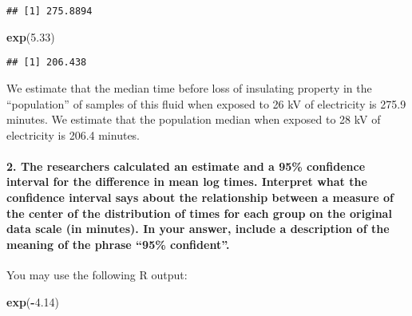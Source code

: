 \documentclass[]{article}
\newenvironment{Shaded}{\begin{snugshade}}{\end{snugshade}}
\newcommand{\FloatTok}[1]{\textcolor[rgb]{0.00,0.00,0.81}{#1}}
\newcommand{\KeywordTok}[1]{\textcolor[rgb]{0.13,0.29,0.53}{\textbf{#1}}}
\newcommand{\NormalTok}[1]{#1}
\newcommand{\OperatorTok}[1]{\textcolor[rgb]{0.81,0.36,0.00}{\textbf{#1}}}
\let\oldparagraph\paragraph
\renewcommand{\paragraph}[1]{\oldparagraph{#1}\mbox{}}
\begin{document}
\begin{verbatim}
## [1] 275.8894
\end{verbatim}

\begin{Shaded}
\begin{Highlighting}[]
\KeywordTok{exp}\NormalTok{(}\FloatTok{5.33}\NormalTok{)}
\end{Highlighting}
\end{Shaded}

\begin{verbatim}
## [1] 206.438
\end{verbatim}

We estimate that the median time before loss of insulating property in
the ``population'' of samples of this fluid when exposed to 26 kV of
electricity is 275.9 minutes. We estimate that the population median
when exposed to 28 kV of electricity is 206.4 minutes.

\vspace{6cm}

\hypertarget{the-researchers-calculated-an-estimate-and-a-95-confidence-interval-for-the-difference-in-mean-log-times.-interpret-what-the-confidence-interval-says-about-the-relationship-between-a-measure-of-the-center-of-the-distribution-of-times-for-each-group-on-the-original-data-scale-in-minutes.-in-your-answer-include-a-description-of-the-meaning-of-the-phrase-95-confident.}{%
\paragraph{2. The researchers calculated an estimate and a 95\%
confidence interval for the difference in mean log times. Interpret what
the confidence interval says about the relationship between a measure of
the center of the distribution of times for each group on the original
data scale (in minutes). In your answer, include a description of the
meaning of the phrase ``95\%
confident''.}\label{the-researchers-calculated-an-estimate-and-a-95-confidence-interval-for-the-difference-in-mean-log-times.-interpret-what-the-confidence-interval-says-about-the-relationship-between-a-measure-of-the-center-of-the-distribution-of-times-for-each-group-on-the-original-data-scale-in-minutes.-in-your-answer-include-a-description-of-the-meaning-of-the-phrase-95-confident.}}

You may use the following R output:

\begin{Shaded}
\begin{Highlighting}[]
\KeywordTok{exp}\NormalTok{(}\OperatorTok{-}\FloatTok{4.14}\NormalTok{)}
\end{Highlighting}
\end{Shaded}
\end{document}
